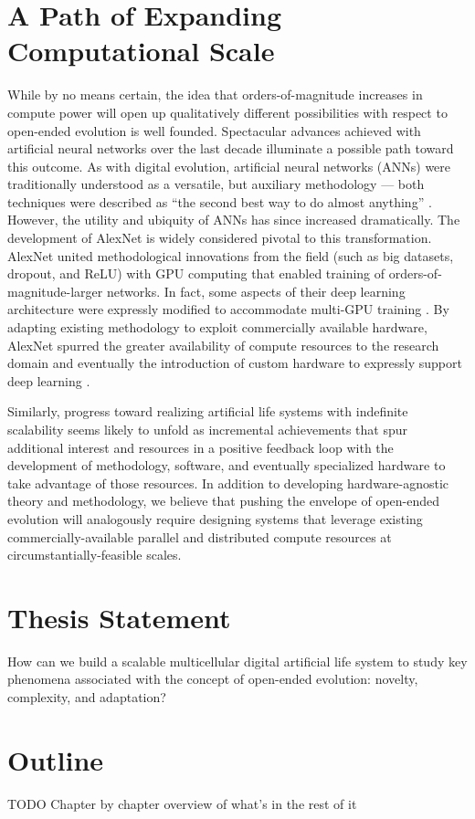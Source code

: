 \section{A Path of Expanding Computational Scale}

While by no means certain, the idea that orders-of-magnitude increases in compute power will open up qualitatively different possibilities with respect to open-ended evolution is well founded.
Spectacular advances achieved with artificial neural networks over the last decade illuminate a possible path toward this outcome. As with digital evolution, artificial neural networks (ANNs) were traditionally understood as a versatile, but auxiliary methodology — both techniques were described as “the second best way to do almost anything” \citep{miaoulis2008intelligent,eiben2015introduction}.
However, the utility and ubiquity of ANNs has since increased dramatically. The development of AlexNet is widely considered pivotal to this transformation. AlexNet united methodological innovations from the field (such as big datasets, dropout, and ReLU) with GPU computing that enabled training of orders-of-magnitude-larger networks.
In fact, some aspects of their deep learning architecture were expressly modified to accommodate multi-GPU training \citep{krizhevsky2012imagenet}.
By adapting existing methodology to exploit commercially available hardware, AlexNet spurred the greater availability of compute resources to the research domain and eventually the introduction of custom hardware to expressly support deep learning \citep{jouppi2017datacenter}.

Similarly, progress toward realizing artificial life systems with indefinite scalability seems likely to unfold as incremental achievements that spur additional interest and resources in a positive feedback loop with the development of methodology, software, and eventually specialized hardware to take advantage of those resources.
In addition to developing hardware-agnostic theory and methodology, we believe that pushing the envelope of open-ended evolution will analogously require designing systems that leverage existing commercially-available parallel and distributed compute resources at circumstantially-feasible scales.

\section{Thesis Statement}

How can we build a scalable multicellular digital artificial life system to study key phenomena associated with the concept of open-ended evolution: novelty, complexity, and adaptation?

\section{Outline}

TODO Chapter by chapter overview of what’s in the rest of it
